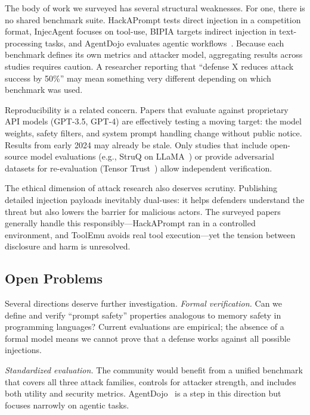 The body of work we surveyed has several structural weaknesses. For one, there is no shared benchmark suite. HackAPrompt tests direct injection in a competition format, InjecAgent focuses on tool-use, BIPIA targets indirect injection in text-processing tasks, and AgentDojo evaluates agentic workflows~\cite{perez2022hackaprompt, zhan2024injecagent, yi2023bipia, debenedetti2024agentdojo}. Because each benchmark defines its own metrics and attacker model, aggregating results across studies requires caution. A researcher reporting that ``defense X reduces attack success by 50\%'' may mean something very different depending on which benchmark was used.

Reproducibility is a related concern. Papers that evaluate against proprietary API models (GPT-3.5, GPT-4) are effectively testing a moving target: the model weights, safety filters, and system prompt handling change without public notice. Results from early 2024 may already be stale. Only studies that include open-source model evaluations (e.g., StruQ on LLaMA~\cite{chen2024struq}) or provide adversarial datasets for re-evaluation (Tensor Trust~\cite{toyer2024tensor}) allow independent verification.

The ethical dimension of attack research also deserves scrutiny. Publishing detailed injection payloads inevitably dual-uses: it helps defenders understand the threat but also lowers the barrier for malicious actors. The surveyed papers generally handle this responsibly---HackAPrompt ran in a controlled environment, and ToolEmu avoids real tool execution---yet the tension between disclosure and harm is unresolved.

\subsection{Open Problems}

Several directions deserve further investigation. \emph{Formal verification.} Can we define and verify ``prompt safety'' properties analogous to memory safety in programming languages? Current evaluations are empirical; the absence of a formal model means we cannot prove that a defense works against all possible injections.

\emph{Standardized evaluation.} The community would benefit from a unified benchmark that covers all three attack families, controls for attacker strength, and includes both utility and security metrics. AgentDojo~\cite{debenedetti2024agentdojo} is a step in this direction but focuses narrowly on agentic tasks.

